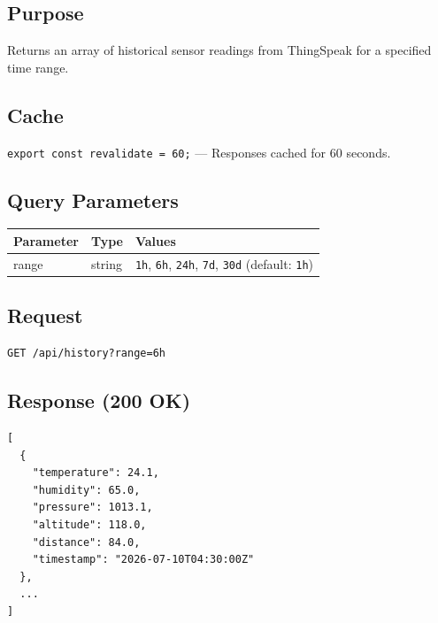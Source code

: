 \subsection{Purpose}
Returns an array of historical sensor readings from ThingSpeak for a specified time range.

\subsection{Cache}
\texttt{export const revalidate = 60;} --- Responses cached for 60 seconds.

\subsection{Query Parameters}
\begin{tabular}{|l|l|l|}
\hline
\rowcolor{FloodLight}
\textbf{Parameter} & \textbf{Type} & \textbf{Values} \\
\hline
range & string & \texttt{1h}, \texttt{6h}, \texttt{24h}, \texttt{7d}, \texttt{30d} (default: \texttt{1h}) \\
\hline
\end{tabular}

\subsection{Request}
\begin{lstlisting}[language={},caption={GET /api/history request}]
GET /api/history?range=6h
\end{lstlisting}

\subsection{Response (200 OK)}
\begin{lstlisting}[language={},caption={GET /api/history success response}]
[
  {
    "temperature": 24.1,
    "humidity": 65.0,
    "pressure": 1013.1,
    "altitude": 118.0,
    "distance": 84.0,
    "timestamp": "2026-07-10T04:30:00Z"
  },
  ...
]
\end{lstlisting}

